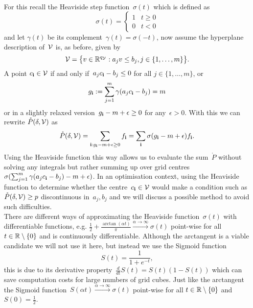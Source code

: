 %
\\[1em]
%
For this recall the Heaviside step function~$\sigma(t)$ which is defined as
%
\begin{equation}
	\sigma(t) = \left\{\begin{array}{rl} 1& t\geq 0\\ 0& t<0\end{array}\right.
\end{equation}
%
and let $\gamma(t)$ be its complement~$\gamma(t)=\sigma(-t)$, now assume the hyperplane description of~$\mathcal V$ is, as before, given by
%
\[
	\mathcal V = \bigl\{v\in\mathbb R^{q_\mathcal Y}:a_jv\leq b_j,j\in\{1,\dots,m\}\bigr\}.
\]
%
A point $c_{\mathbf{i}}\in\mathcal V$ if and only if~$a_jc_{\mathbf{i}}-b_j\leq 0$ for all $j\in\{1,\dots,m\}$, or 
%
\begin{equation}
	g_{\mathbf{i}}:=\sum_{j=1}^{m}\gamma(a_j c_{\mathbf{i}}-b_j)=m
\end{equation}
%
or in a slightly relaxed version~$g_{\mathbf{i}}-m+\epsilon\geq0$ for any~$\epsilon>0$.
%
With this we can rewrite $\mathring P(\delta,\mathcal V)$ as
%
\begin{equation}\label{eq:sum:using:sigma}
	\mathring P(\delta,\mathcal V) = \sum_{\mathbf{i}:g_{\mathbf{i}}-m+\epsilon\geq0} f_{\mathbf{i}} = \sum_{\mathbf{i}}\sigma(g_{\mathbf{i}}-m+\epsilon)f_{\mathbf{i}}.
\end{equation}
%
Using the Heaviside function this way allows us to evaluate the sum~$\mathring P$ without solving any integrals but rather summing up over grid centres~$\sigma(\sum_{j=1}^m\gamma(a_jc_{\mathbf{i}}-b_j)-m+\epsilon)$.
%
In an optimisation context, using the Heaviside function to determine whether the centre~$c_{\mathbf{i}}\in\mathcal V$ would make a condition such as~$\mathring P(\delta,\mathcal V)\geq p$ discontinuous in~$a_j,b_j$ and we will discuss a possible method to avoid such difficulties.
%
\\[1em]
%
\mysplit There are different ways of approximating the Heaviside function~$\sigma(t)$ with differentiable functions, e.g. $\frac{1}{2}+\frac{\arctan(\alpha t)}{\pi}\xrightarrow{\alpha\rightarrow\infty}\sigma(t)$ point-wise for all~$t\in\mathbb R\setminus\{0\}$ and is continuously differentiable.
%
Although the arctangent is a viable candidate we will not use it here, but instead we use the Sigmoid function
%
\begin{equation}
	S(t) = \frac{1}{1+e^{-t}},
\end{equation}
%
this is due to its derivative property~$\frac{d}{dt}S(t) = S(t)(1-S(t))$ which can save computation costs for large numbers of grid cubes.
%
Just like the arctangent the Sigmoid function~$S(\alpha t)\xrightarrow{\alpha\rightarrow\infty}\sigma(t)$ point-wise for all $t\in\mathbb R\setminus\{0\}$ and $S(0)=\frac{1}{2}$.
